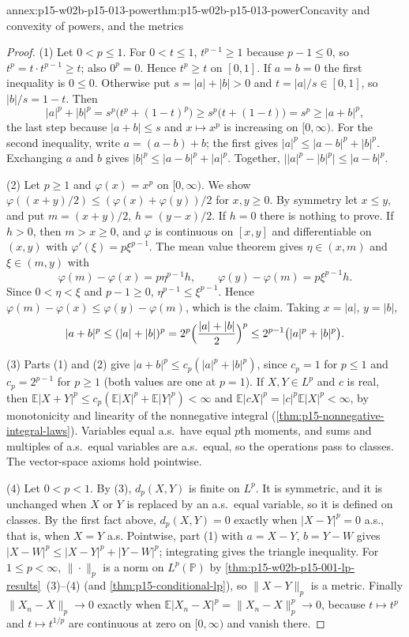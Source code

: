 \begin{annexitem}{annex:p15-w02b-p15-013-power}{thm:p15-w02b-p15-013-power}{Concavity and convexity of powers, and the metrics}
\begin{proof}
(1) Let \(0<p\leq1\). For \(0<t\leq1\), \(t^{p-1}\geq1\) because
\(p-1\leq0\), so \(t^p=t\cdot t^{p-1}\geq t\); also \(0^p=0\). Hence
\(t^p\geq t\) on \([0,1]\). If \(a=b=0\) the first inequality is
\(0\leq0\). Otherwise put \(s=|a|+|b|>0\) and \(t=|a|/s\in[0,1]\), so
\(|b|/s=1-t\). Then
\[
 |a|^p+|b|^p=s^p\bigl(t^p+(1-t)^p\bigr)\geq s^p\bigl(t+(1-t)\bigr)
 =s^p\geq|a+b|^p,
\]
the last step because \(|a+b|\leq s\) and \(x\mapsto x^p\) is
increasing on \([0,\infty)\). For the second inequality, write
\(a=(a-b)+b\); the first gives \(|a|^p\leq|a-b|^p+|b|^p\). Exchanging
\(a\) and \(b\) gives \(|b|^p\leq|a-b|^p+|a|^p\). Together,
\(\bigl||a|^p-|b|^p\bigr|\leq|a-b|^p\).

(2) Let \(p\geq1\) and \(\varphi(x)=x^p\) on \([0,\infty)\). We show
\(\varphi((x+y)/2)\leq(\varphi(x)+\varphi(y))/2\) for \(x,y\geq0\).
By symmetry let \(x\leq y\), and put \(m=(x+y)/2\), \(h=(y-x)/2\). If
\(h=0\) there is nothing to prove. If \(h>0\), then \(m>x\geq0\), and
\(\varphi\) is continuous on \([x,y]\) and differentiable on \((x,y)\)
with \(\varphi'(\xi)=p\xi^{p-1}\). The mean value theorem gives
\(\eta\in(x,m)\) and \(\xi\in(m,y)\) with
\[
 \varphi(m)-\varphi(x)=p\eta^{p-1}h,\qquad
 \varphi(y)-\varphi(m)=p\xi^{p-1}h.
\]
Since \(0<\eta<\xi\) and \(p-1\geq0\), \(\eta^{p-1}\leq\xi^{p-1}\).
Hence \(\varphi(m)-\varphi(x)\leq\varphi(y)-\varphi(m)\), which is the
claim. Taking \(x=|a|\), \(y=|b|\),
\[
 |a+b|^p\leq(|a|+|b|)^p=2^p\Bigl(\frac{|a|+|b|}2\Bigr)^p
 \leq2^{p-1}\bigl(|a|^p+|b|^p\bigr).
\]

(3) Parts (1) and (2) give \(|a+b|^p\leq c_p(|a|^p+|b|^p)\), since
\(c_p=1\) for \(p\leq1\) and \(c_p=2^{p-1}\) for \(p\geq1\) (both
values are one at \(p=1\)). If \(X,Y\in L^p\) and \(c\) is real, then
\(\mathbb E|X+Y|^p\leq c_p(\mathbb E|X|^p+\mathbb E|Y|^p)<\infty\) and
\(\mathbb E|cX|^p=|c|^p\mathbb E|X|^p<\infty\), by monotonicity and
linearity of the nonnegative integral
(\cref{thm:p15-nonnegative-integral-laws}). Variables equal a.s.\ have
equal \(p\)th moments, and sums and multiples of a.s.\ equal variables
are a.s.\ equal, so the operations pass to classes. The vector-space
axioms hold pointwise.

(4) Let \(0<p<1\). By (3), \(d_p(X,Y)\) is finite on \(L^p\). It is
symmetric, and it is unchanged when \(X\) or \(Y\) is replaced by an
a.s.\ equal variable, so it is defined on classes. By the first fact
above, \(d_p(X,Y)=0\) exactly when \(|X-Y|^p=0\) a.s., that is, when
\(X=Y\) a.s. Pointwise, part (1) with \(a=X-Y\), \(b=Y-W\) gives
\(|X-W|^p\leq|X-Y|^p+|Y-W|^p\); integrating gives the triangle
inequality. For \(1\leq p<\infty\), \(\|\cdot\|_p\) is a norm on
\(L^p(\mathbb P)\) by \cref{thm:p15-w02b-p15-001-lp-results}~(3)--(4)
(and \cref{thm:p15-conditional-lp}), so \(\|X-Y\|_p\) is a metric.
Finally \(\|X_n-X\|_p\to0\) exactly when
\(\mathbb E|X_n-X|^p=\|X_n-X\|_p^p\to0\), because \(t\mapsto t^p\)
and \(t\mapsto t^{1/p}\) are continuous at zero on \([0,\infty)\) and
vanish there.


\end{proof}
\end{annexitem}
